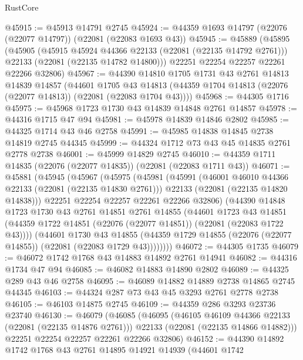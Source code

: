 \begin{lexlean}{RustCore}
\begin{coremodule}
@45915 := @45913 @14791 @2745
@45924 := @44359 @1693 @14797 (@22076 (@22077 @14797)) (@22081 (@22083 @1693 @43))
@45945 := @45889
    (@45895
      (@45905
        (@45915 @45924 @44366 @22133 (@22081 (@22135 @14792 @2761)))
        @22133
        (@22081 (@22135 @14782 @14800)))
      @22251
      @22254
      @22257
      @22261
      @22266
      @32806)
@45967 := @44390
    @14810
    @1705
    @1731
    @43
    @2761
    @14813
    @14839
    @14857
    (@44601
      @1705
      @43
      @14813
      (@44359 @1704 @14813 (@22076 (@22077 @14813)) (@22081 (@22083 @1704 @43))))
@45968 := @44305 @1716
@45975 := @45968 @1723 @1730 @43 @14839 @14848 @2761 @14857
@45978 := @44316 @1715 @47 @94
@45981 := @45978 @14839 @14846 @2802
@45985 := @44325 @1714 @43 @46 @2758
@45991 := @45985 @14838 @14845 @2738 @14819 @2745 @44345
@45999 := @44324 @1712 @73 @43 @45 @14835 @2761 @2778 @2738
@46001 := @45999 @14829 @2745
@46010 := @44359 @1711 @14835 (@22076 (@22077 @14835)) (@22081 (@22083 @1711 @43))
@46071 := @45881
    (@45945
      (@45967
        (@45975
          (@45981
            (@45991
              (@46001 @46010 @44366 @22133 (@22081 (@22135 @14830 @2761)))
              @22133
              (@22081 (@22135 @14820 @14838)))
            @22251
            @22254
            @22257
            @22261
            @22266
            @32806)
          (@44390
            @14848
            @1723
            @1730
            @43
            @2761
            @14851
            @2761
            @14855
            (@44601
              @1723
              @43
              @14851
              (@44359 @1722 @14851 (@22076 (@22077 @14851)) (@22081 (@22083 @1722 @43))))
            (@44601
              @1730
              @43
              @14855
              (@44359 @1729 @14855 (@22076 (@22077 @14855)) (@22081 (@22083 @1729 @43))))))))
@46072 := @44305 @1735
@46079 := @46072 @1742 @1768 @43 @14883 @14892 @2761 @14941
@46082 := @44316 @1734 @47 @94
@46085 := @46082 @14883 @14890 @2802
@46089 := @44325 @289 @43 @46 @2758
@46095 := @46089 @14882 @14889 @2738 @14865 @2745 @44345
@46103 := @44324 @287 @73 @43 @45 @3293 @2761 @2778 @2738
@46105 := @46103 @14875 @2745
@46109 := @44359 @286 @3293 @23736 @23740
@46130 := @46079
    (@46085
      (@46095
        (@46105 @46109 @44366 @22133 (@22081 (@22135 @14876 @2761)))
        @22133
        (@22081 (@22135 @14866 @14882)))
      @22251
      @22254
      @22257
      @22261
      @22266
      @32806)
@46152 := @44390
    @14892
    @1742
    @1768
    @43
    @2761
    @14895
    @14921
    @14939
    (@44601
      @1742

\end{coremodule}
\end{lexlean}
